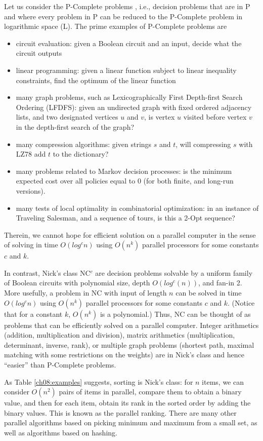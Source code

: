 Let us consider the P-Complete problems \cite{greenlaw1995limits}, i.e.,  decision problems that are in P and where every problem in P can be reduced to the P-Complete problem in logarithmic space (L). The prime examples of  P-Complete problems are 
\begin{itemize} 
\item circuit evaluation: given a Boolean circuit and an input, decide what the circuit outputs
\item linear programming: given a linear function subject to linear inequality constraints, find the optimum of the linear function
\item many graph problems, such as Lexicographically First Depth-first Search Ordering (LFDFS):
given an undirected graph with fixed ordered adjacency lists, and two designated vertices $u$ and $v$, is vertex $u$ visited before vertex $v$ in the depth-first search of the graph?
\item many compression algorithms: given strings $s$ and $t$, will compressing $s$ with LZ78 add $t$ to the dictionary?
\item many problems related to Markov decision processes: is the minimum expected cost over all policies equal to 0 (for both finite, and long-run versions). 
\item many tests of local optimality in combinatorial optimization: in an instance of Traveling Salesman, and a sequence of tours, is this a 2-Opt sequence? 
\end{itemize} 
Therein, we cannot hope for efficient solution on a parallel computer in the sense of solving in time $O(log^c n)$ using $O(n^k)$ parallel processors for some constants $c$ and $k$. 

In contrast, Nick's class NC$^{c}$ are decision problems solvable by a uniform family of Boolean circuits with polynomial size, depth $O(log^c(n))$, and fan-in 2. More usefully, a problem in NC with input of length $n$ can be solved in time $O(log^c n)$ using $O(n^k)$ parallel processors for some  constants $c$ and $k$. (Notice that for a constant $k$, $O(n^k)$ is a polynomial.) Thus, NC can be thought of as problems that can be efficiently solved on a parallel computer. Integer arithmetics (addition, multiplication and division), matrix arithmetics (multiplication, determinant, inverse, rank), or multiple graph problems (shortest path, maximal matching with some restrictions on the weights) are in Nick's class and hence ``easier'' than P-Complete problems. 

As Table \ref{ch08:examples} suggests, sorting is Nick's class: for $n$ items, we can consider $O(n^2)$ pairs of items in parallel, compare them to obtain a binary value, and then for each item, obtain its rank in the sorted order by adding the binary values. This is known as the parallel ranking. There are many other parallel algorithms based on picking minimum and maximum from a small set, as well as algorithms based on hashing.


